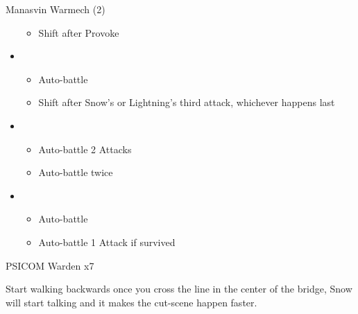 \begin{paracol}{2}
\begin{battle}{Manasvin Warmech (2)}
\begin{itemize}
			      \begin{itemize}
				      \item Shift after Provoke
			      \end{itemize}
			\item \third
			      \begin{itemize}
				      \item Auto-battle
				      \item Shift after Snow's or Lightning's third attack, whichever happens last
			      \end{itemize}
			\item \fourth
			      \begin{itemize}
				      \item Auto-battle 2 Attacks
				      \item Auto-battle twice
			      \end{itemize}
			\item \third
			      \begin{itemize}
				      \item Auto-battle
				      \item Auto-battle 1 Attack if survived
			      \end{itemize}
		\end{itemize}
	\end{battle}
	\switchcolumn
\begin{battle}{PSICOM Warden x7}
 
\end{battle}

Start walking backwards once you cross the line in the center of the bridge, Snow will start talking and it makes the cut-scene happen faster.


\end{paracol}
